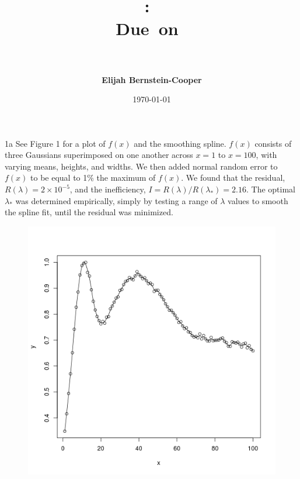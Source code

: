 \documentclass[11pt]{article}
\title{\vspace{0in}
    \textmd{\textbf{\hmwkClass:\ \hmwkTitle}}\\
    \normalsize\vspace{0.1in}\small{Due\ on\ \hmwkDueDate}\\
    \vspace{0.1in}\large{\textit{\hmwkClassInstructor\ \hmwkClassTime}}
    \vspace{0.2in}}
\author{\textbf{Elijah Bernstein-Cooper}}
\date{\today} %
\begin{document}
\maketitle

\begin{homeworkProblem}

    \begin{homeworkSection}{1a}
        See Figure 1 for a plot of $f(x)$ and the smoothing spline. $f(x)$
        consists of three Gaussians superimposed on one another across $x =
        1$ to $x = 100$, with varying means, heights, and widths. We then
        added normal random error to $f(x)$ to be equal to 1\% the maximum
        of $f(x)$. We found that the residual, $R(\lambda) = 2 \times
        10^{-5}$, and the inefficiency, $I = R(\lambda)/R(\lambda_*) =
        2.16$. The optimal $\lambda_*$ was determined empirically, simply by
        testing a range of $\lambda$ values to smooth the spline fit, until the
        residual was minimized.\\

        \begin{figure}[!ht]
           
            \begin{centering}
                \includegraphics[scale=0.8]{hw8_1a_f_vs_x.png}


\end{centering}
\end{figure}
\end{homeworkSection}
\end{homeworkProblem}
\end{document}
